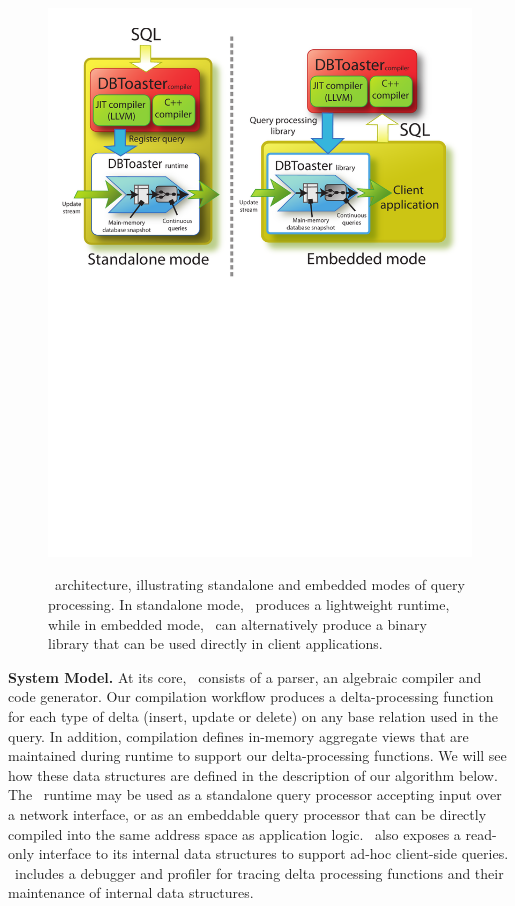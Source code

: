\begin{figure}[tb]
\includegraphics[scale=0.42]{figures/dbt-arch.pdf}
\label{fig:dbtarch}

\vspace{-4mm}

\caption{\compiler\ architecture, illustrating standalone and embedded modes of
query processing. In standalone mode, \compiler\ produces a lightweight
runtime, while in embedded mode, \compiler\ can alternatively produce a binary
library that can be used directly in client applications.}
\end{figure}

\noindent\textbf{System Model.}
At its core, \compiler\ consists of a parser, an algebraic compiler and
code generator. Our compilation workflow produces a delta-processing function
for each type of delta (insert, update or delete) on any base relation used in
the query. In addition, compilation defines in-memory aggregate views that are
maintained during runtime to support our delta-processing functions. We will
see how these data structures are defined in the description of our algorithm
below. The \compiler\ runtime may be used as a standalone query processor
accepting input over a network interface, or as an embeddable query processor
that can be directly compiled into the same address space as application logic.
\compiler\ also exposes a read-only interface to its internal data structures to
support ad-hoc client-side queries. \compiler\ includes a debugger and
profiler for tracing delta processing functions and their maintenance of
internal data structures.

